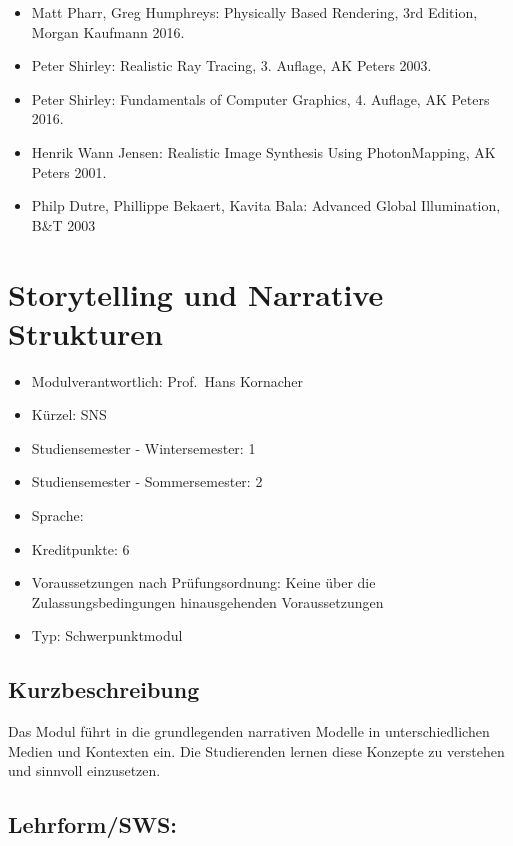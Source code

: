 \begin{itemize}
\item
  Matt Pharr, Greg Humphreys: Physically Based Rendering, 3rd Edition,
  Morgan Kaufmann 2016.
\item
  Peter Shirley: Realistic Ray Tracing, 3. Auflage, AK Peters 2003.
\item
  Peter Shirley: Fundamentals of Computer Graphics, 4. Auflage, AK
  Peters 2016.
\item
  Henrik Wann Jensen: Realistic Image Synthesis Using PhotonMapping, AK
  Peters 2001.
\item
  Philp Dutre, Phillippe Bekaert, Kavita Bala: Advanced Global
  Illumination, B\&T 2003
\end{itemize}

\chapter{Storytelling und Narrative
Strukturen}\label{storytelling-und-narrative-strukturen}

\begin{itemize}
\tightlist
\item
  Modulverantwortlich: Prof.~Hans Kornacher
\item
  Kürzel: SNS
\item
  Studiensemester - Wintersemester: 1
\item
  Studiensemester - Sommersemester: 2
\item
  Sprache: ~
\item
  Kreditpunkte: 6
\item
  Voraussetzungen nach Prüfungsordnung: Keine über die
  Zulassungsbedingungen hinausgehenden Voraussetzungen
\item
  Typ: Schwerpunktmodul
\end{itemize}

\section*{Kurzbeschreibung}\label{kurzbeschreibung-8}

Das Modul führt in die grundlegenden narrativen Modelle in
unterschiedlichen Medien und Kontexten ein. Die Studierenden lernen
diese Konzepte zu verstehen und sinnvoll einzusetzen.

\section*{Lehrform/SWS:}\label{lehrformsws-17}

